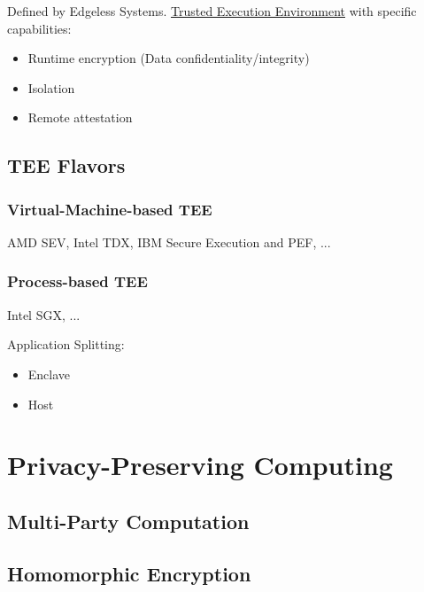 Defined by Edgeless Systems. \hyperref[sec:TEE]{Trusted Execution Environment}
with specific capabilities:

\begin{itemize}
  \item Runtime encryption (Data confidentiality/integrity)
  \item Isolation
  \item Remote attestation
\end{itemize}

\section{TEE Flavors}

\subsection{Virtual-Machine-based TEE}

AMD SEV, Intel TDX, IBM Secure Execution and PEF, ...

\subsection{Process-based TEE}

Intel SGX, ...

Application Splitting:

\begin{itemize}
  \item Enclave
  \item Host
\end{itemize}


\chapter{Privacy-Preserving Computing}

\section{Multi-Party Computation}

\section{Homomorphic Encryption}

